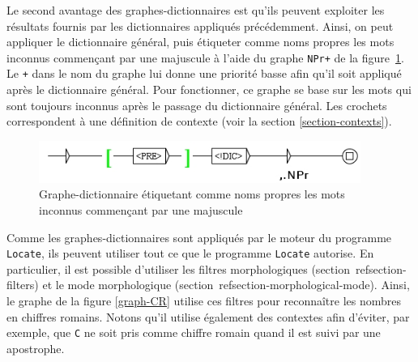 \bigskip
\noindent Le second avantage des graphes-dictionnaires est qu’ils peuvent exploiter les résultats
fournis par les dictionnaires appliqués précédemment. Ainsi, on peut appliquer le dictionnaire
général, puis étiqueter comme noms propres les mots inconnus commençant par une majuscule à l’aide
du graphe \verb$NPr+$ de la figure~\ref{graph-NPr}. Le \verb$+$ dans le nom du graphe lui donne une
priorité basse afin qu’il soit appliqué après le dictionnaire général. Pour fonctionner, ce graphe
se base sur les mots qui sont toujours inconnus après le passage du dictionnaire général. Les
crochets correspondent à une définition de contexte (voir la section \ref{section-contexts}).

\begin{figure}[!h]
\begin{center}
\includegraphics[width=10.5cm]{resources/img/fig3-13.png}
\caption{Graphe-dictionnaire étiquetant comme noms propres les mots inconnus commençant par une
majuscule
\label{graph-NPr}}
\end{center}
\end{figure}

\bigskip
\noindent Comme les graphes-dictionnaires sont appliqués par le moteur du programme \verb+Locate+,
ils peuvent utiliser tout ce que le programme \verb+Locate+ autorise. En particulier, il est
possible d’utiliser les filtres morphologiques (section~ref{section-filters}) et le mode morphologique (section~ref{section-morphological-mode}).
Ainsi, le graphe de la figure \ref{graph-CR} utilise ces filtres pour reconnaître les nombres en
chiffres romains. Notons qu’il utilise également des contextes afin d’éviter, par exemple, que
\verb+C+ ne soit pris comme chiffre romain quand il est suivi par une apostrophe.

